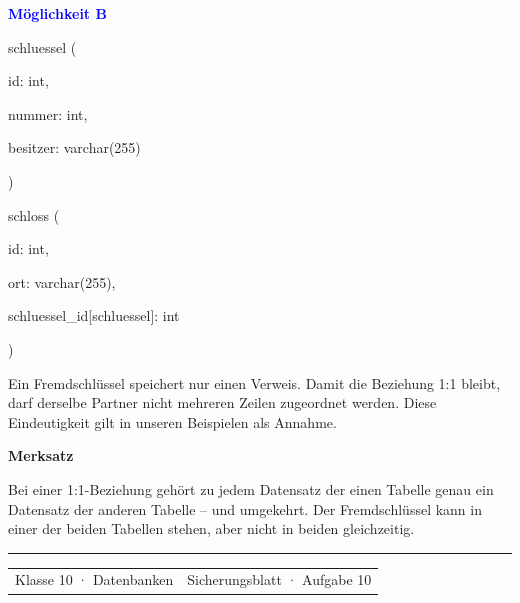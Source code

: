 \documentclass[10pt,a4paper]{article}
\newcommand{\sectiontitle}[1]{%
  \vspace{2.3mm}{\color{Blue}\bfseries\large #1}\par
  \vspace{0.7mm}{\color{Blue}\rule{\linewidth}{0.7pt}}\par\vspace{1.2mm}}
\newcommand{\schema}[1]{\colorbox{CodeBg}{\parbox{\dimexpr\linewidth-2\fboxsep\relax}{\ttfamily\small #1}}}
\begin{document}
\begin{minipage}[t]{0.48\linewidth}
\textcolor{Blue}{\bfseries Möglichkeit B}\par\vspace{0.6mm}
\schema{schluessel (\par
\quad id: int,\par
\quad nummer: int,\par
\quad besitzer: varchar(255)\par
)\par\vspace{1mm}
schloss (\par
\quad id: int,\par
\quad ort: varchar(255),\par
\quad schluessel\_id[schluessel]: int\par
)}
\end{minipage}
\par\vspace{1.2mm}
\sectiontitle{3 · Eindeutigkeit}
{\small Ein Fremdschlüssel speichert nur einen Verweis. Damit die Beziehung 1:1 bleibt, darf derselbe Partner nicht mehreren Zeilen zugeordnet werden. Diese Eindeutigkeit gilt in unseren Beispielen als Annahme.}\par\vspace{1mm}
\begin{tcolorbox}[colback=Mint,colframe=Blue,arc=2mm,boxrule=.8pt,left=3mm,right=3mm,top=1.7mm,bottom=1.7mm]
\textbf{Merksatz}\par\smallskip
Bei einer 1:1-Beziehung gehört zu jedem Datensatz der einen Tabelle genau ein Datensatz der anderen Tabelle -- und umgekehrt. Der Fremdschlüssel kann in einer der beiden Tabellen stehen, aber nicht in beiden gleichzeitig.
\end{tcolorbox}

\vfill{\color{Line}\rule{\linewidth}{.5pt}}\par\vspace{1.5mm}
\begin{tabularx}{\linewidth}{@{}Xr@{}}{\small\color{Muted}Klasse 10 · Datenbanken} & {\small\color{Muted}Sicherungsblatt · Aufgabe 10}\end{tabularx}
\end{document}
